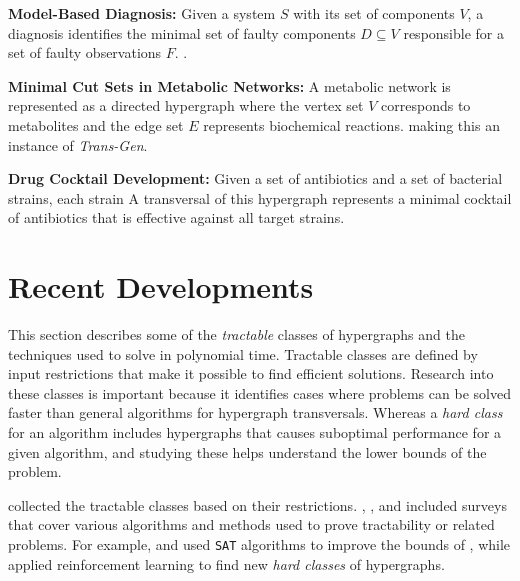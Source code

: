 \textbf{Model-Based Diagnosis:} Given a system $S$ with its set of components $V$, a diagnosis identifies the minimal set of faulty components $D\subseteq V$ responsible for a set of faulty observations $F$.   \cite{Rei87}.

\textbf{Minimal Cut Sets in Metabolic Networks:} A metabolic network is represented as a directed hypergraph where the vertex set $V$ corresponds to metabolites and the edge set $E$ represents biochemical reactions.   making this an instance of \emph{Trans-Gen}.

\textbf{Drug Cocktail Development:} Given a set of antibiotics and a set of bacterial strains, each strain   A transversal of this hypergraph represents a minimal cocktail of antibiotics that is effective against all target strains.

\section{Recent Developments}

This section describes some of the \emph{tractable} classes of hypergraphs and the techniques used to solve \TransHyp{} in polynomial time. Tractable classes are defined by input restrictions that make it possible to find efficient solutions. Research into these classes is important because it identifies cases where problems can be solved faster than general algorithms for hypergraph transversals. Whereas a \emph{hard class} for an algorithm includes hypergraphs that causes suboptimal performance for a given algorithm, and studying these helps understand the lower bounds of the problem.

\cite{Hag08} collected the tractable classes based on their restrictions. \cite{EMG08}, \cite{GDVL17}, and \cite{DNU21} included surveys that cover various algorithms and methods used to prove tractability or related problems. For example, \cite{MZ11} and \cite{Her04} used \texttt{SAT} algorithms to improve the bounds of \FKA, while \cite{SS24} applied reinforcement learning to find new \emph{hard classes} of hypergraphs.

